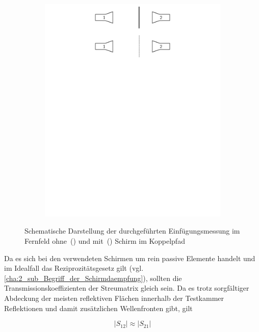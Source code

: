 \begin{figure}[ht]
\begin{subfigure}[b]{0.99\textwidth}
       \includegraphics[page = 1, width=\textwidth, trim = 0cm 17.5cm 0cm 0cm, clip]{Abbildungen/Kapitel4/Einfuegungsmessung.pdf}
        \caption{\label{subfig:4_Einfuegungsmessung_Fall2}}
    \end{subfigure}
    \caption[Schematische Darstellung der durchgeführten Einfügungsmessung]{Schematische Darstellung der durchgeführten Einfügungsmessung im Fernfeld ohne~() und mit~() Schirm im Koppelpfad}
    \label{fig:4_Einfuegungsmessung}
\end{figure}


Da es sich bei den verwendeten Schirmen um rein passive Elemente handelt und im Idealfall das Reziprozitätsgesetz gilt (vgl. \Abschnitt\ref{cha:2_sub_Begriff_der_Schirmdaempfung}), sollten die Transmissionskoeffizienten der Streumatrix gleich sein. Da es trotz sorgfältiger Abdeckung der meisten reflektiven Flächen innerhalb der Testkammer Reflektionen und damit zusätzlichen Wellenfronten gibt, gilt 

\begin{equation}
    |S_{12}| \approx |S_{21}|\label{eq:4_Naeherung_Transmissionskoeffizienten}
\end{equation}

